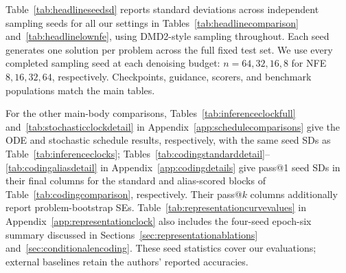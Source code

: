 \documentclass[11pt,letterpaper]{article}
\begin{document}
Table~\ref{tab:headlineseedsd} reports standard deviations across independent sampling seeds for all our settings in Tables~\ref{tab:headlinecomparison} and~\ref{tab:headlinelownfe}, using DMD2-style sampling throughout. Each seed generates one solution per problem across the full fixed test set. We use every completed sampling seed at each denoising budget: $n=64,32,16,8$ for NFE $8,16,32,64$, respectively. Checkpoints, guidance, scorers, and benchmark populations match the main tables.

For the other main-body comparisons, Tables~\ref{tab:inferenceclockfull} and~\ref{tab:stochasticclockdetail} in Appendix~\ref{app:schedulecomparisons} give the ODE and stochastic schedule results, respectively, with the same seed SDs as Table~\ref{tab:inferenceclocks}; Tables~\ref{tab:codingstandarddetail}--\ref{tab:codingaliasdetail} in Appendix~\ref{app:codingdetails} give pass@1 seed SDs in their final columns for the standard and alias-scored blocks of Table~\ref{tab:codingcomparison}, respectively. Their pass@$k$ columns additionally report problem-bootstrap SEs. Table~\ref{tab:representationcurvevalues} in Appendix~\ref{app:representationclock} also includes the four-seed epoch-six summary discussed in Sections~\ref{sec:representationablations} and~\ref{sec:conditionalencoding}. These seed statistics cover our evaluations; external baselines retain the authors' reported accuracies.
\end{document}
